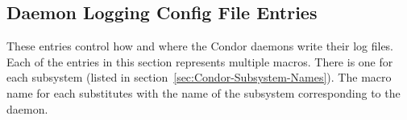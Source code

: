 \begin{description}
\end{description}


\subsection{\label{sec:Daemon-Logging-Config-File-Entries}Daemon Logging Config File Entries} 

These entries control how and where the Condor daemons write their log
files.  Each of the entries in this section represents multiple
macros. There is one for each subsystem (listed
in section~\ref{sec:Condor-Subsystem-Names}).
The macro name for each substitutes  with the name
of the subsystem corresponding to the daemon.
